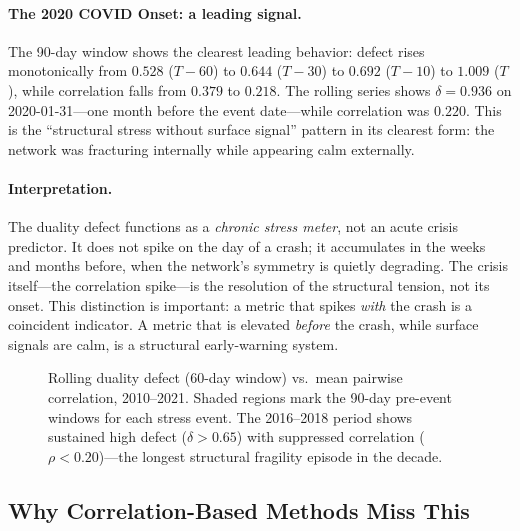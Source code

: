 \documentclass[11pt]{article}
\begin{document}
\paragraph{The 2020 COVID Onset: a leading signal.}
The 90-day window shows the clearest leading behavior:
defect rises monotonically from $0.528$ ($T{-}60$) to $0.644$
($T{-}30$) to $0.692$ ($T{-}10$) to $1.009$ ($T$), while correlation
falls from $0.379$ to $0.218$.
The rolling series shows $\delta = 0.936$ on 2020-01-31---one month
before the event date---while correlation was $0.220$.
This is the ``structural stress without surface signal'' pattern in its
clearest form: the network was fracturing internally while appearing
calm externally.

\paragraph{Interpretation.}
The duality defect functions as a \emph{chronic stress meter}, not an
acute crisis predictor.
It does not spike on the day of a crash; it accumulates in the weeks
and months before, when the network's symmetry is quietly degrading.
The crisis itself---the correlation spike---is the resolution of the
structural tension, not its onset.
This distinction is important: a metric that spikes \emph{with} the
crash is a coincident indicator.
A metric that is elevated \emph{before} the crash, while surface
signals are calm, is a structural early-warning system.

\begin{figure}[h]
\centering
{}
\caption{Rolling duality defect (60-day window) vs.\ mean pairwise
correlation, 2010--2021. Shaded regions mark the 90-day pre-event
windows for each stress event. The 2016--2018 period shows sustained
high defect ($\delta > 0.65$) with suppressed correlation ($\rho <
0.20$)---the longest structural fragility episode in the decade.}
\label{fig:rolling}
\end{figure}

\subsection{Why Correlation-Based Methods Miss This}
\end{document}
